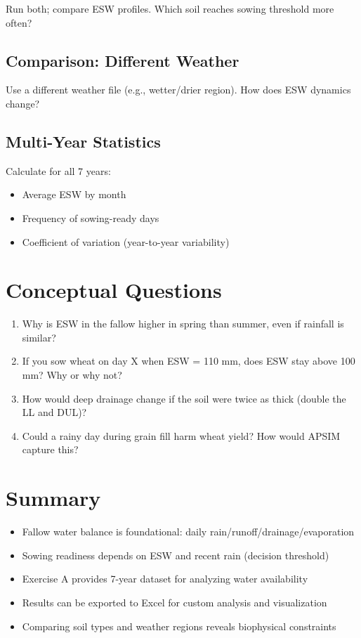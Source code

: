 Run both; compare ESW profiles. Which soil reaches sowing threshold more often?

\subsection{Comparison: Different Weather}

Use a different weather file (e.g., wetter/drier region). How does ESW dynamics change?

\subsection{Multi-Year Statistics}

Calculate for all 7 years:
\begin{itemize}
  \item Average ESW by month
  \item Frequency of sowing-ready days
  \item Coefficient of variation (year-to-year variability)
\end{itemize}

\section{Conceptual Questions}

\begin{enumerate}
  \item Why is ESW in the fallow higher in spring than summer, even if rainfall is similar?
  
  \item If you sow wheat on day X when ESW = 110 mm, does ESW stay above 100 mm? Why or why not?
  
  \item How would deep drainage change if the soil were twice as thick (double the LL and DUL)?
  
  \item Could a rainy day during grain fill harm wheat yield? How would APSIM capture this?
\end{enumerate}

\section{Summary}

\begin{itemize}
  \item Fallow water balance is foundational: daily rain/runoff/drainage/evaporation
  \item Sowing readiness depends on ESW and recent rain (decision threshold)
  \item Exercise A provides 7-year dataset for analyzing water availability
  \item Results can be exported to Excel for custom analysis and visualization
  \item Comparing soil types and weather regions reveals biophysical constraints
\end{itemize}

